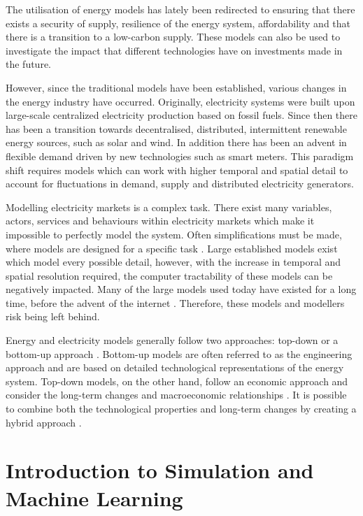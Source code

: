 The utilisation of energy models has lately been redirected to ensuring that there exists a security of supply, resilience of the energy system, affordability and that there is a transition to a low-carbon supply. These models can also be used to investigate the impact that different technologies have on investments made in the future. 

However, since the traditional models have been established, various changes in the energy industry have occurred. Originally, electricity systems were built upon large-scale centralized electricity production based on fossil fuels. Since then there has been a transition towards decentralised, distributed, intermittent renewable energy sources, such as solar and wind. In addition there has been an advent in flexible demand driven by new technologies such as smart meters. This paradigm shift requires models which can work with higher temporal and spatial detail to account for fluctuations in demand, supply and distributed electricity generators.

Modelling electricity markets is a complex task. There exist many variables, actors, services and behaviours within electricity markets which make it impossible to perfectly model the system. Often simplifications must be made, where models are designed for a specific task \cite{Pfenninger2014b}. Large established models exist which model every possible detail, however, with the increase in temporal and spatial resolution required, the computer tractability of these models can be negatively impacted. Many of the large models used today have existed for a long time, before the advent of the internet \cite{Pfenninger2014b}. Therefore, these models and modellers risk being left behind.

Energy and electricity models generally follow two approaches: top-down or a bottom-up approach \cite{Ringkjob2018}. Bottom-up models are often referred to as the engineering approach and are based on detailed technological representations of the energy system. Top-down models, on the other hand, follow an economic approach and consider the long-term changes and macroeconomic relationships \cite{Mai2013}. It is possible to combine both the technological properties and long-term changes by creating a hybrid approach \cite{Fortes2014}.




\section{Introduction to Simulation and Machine Learning}
\label{sec:intro:simulationmodelling}

